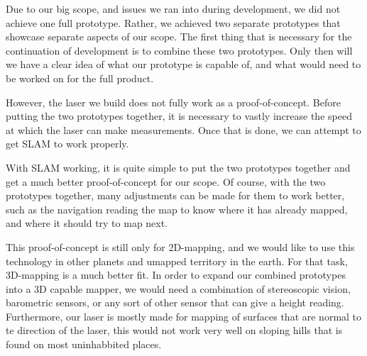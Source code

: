 Due to our big scope, and issues we ran into during development, we did not achieve one full prototype. Rather, we achieved two separate prototypes that showcase separate aspects of our scope. The first thing that is necessary for the continuation of development is to combine these two prototypes. Only then will we have a clear idea of what our prototype is capable of, and what would need to be worked on for the full product.

However, the laser we build does not fully work as a proof-of-concept. Before putting the two prototypes together, it is necessary to vastly increase the speed at which the laser can make measurements. Once that is done, we can attempt to get SLAM to work properly.

With SLAM working, it is quite simple to put the two prototypes together and get a much better proof-of-concept for our scope. Of course, with the two prototypes together, many adjustments can be made for them to work better, such as the navigation reading the map to know where it has already mapped, and where it should try to map next.

This proof-of-concept is still only for 2D-mapping, and we would like to use this technology in other planets and umapped territory in the earth. For that task, 3D-mapping is a much better fit. In order to expand our combined prototypes into a 3D capable mapper, we would need a combination of stereoscopic vision, barometric sensors, or any sort of other sensor that can give a height reading. Furthermore, our laser is mostly made for mapping of surfaces that are normal to te direction of the laser, this would not work very well on sloping hills that is found on most uninhabbited places.





